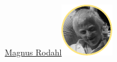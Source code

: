 \documentclass[xetex]{beamer}
\begin{document}
\begin{frame}
\begin{columns}[]
\begin{column}{0.5\textwidth}
      \hspace{5.9em}\underline{{\;\tiny Magnus Rodahl}\includegraphics[scale=1.0]{grafikk/portretter/magnus.pdf}}
    \end{column}
​  \end{columns}
\thispagestyle{empty}
\end{frame}
\end{document}
